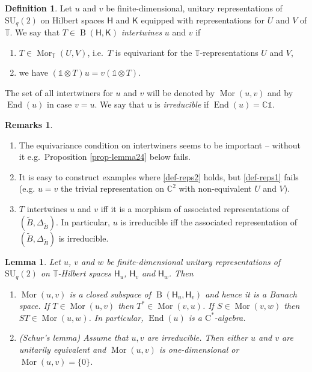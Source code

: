 \documentclass[12pt,reqno,a4paper]{amsart}
\newtheorem{lemma}[proposition]{Lemma}
\theoremstyle{definition}
\newtheorem{definition}[proposition]{Definition}
\newtheorem{remarks}[proposition]{Remarks}
\newtheorem{question}[proposition]{Question}
\newcommand{\cst}{\ensuremath{\mathrm{C}^*}}
\newcommand{\I}{\mathds{1}}
\newcommand{\ket}[1]{{\left|#1\right\rangle}}
\newcommand{\bra}[1]{{\left\langle#1\right|}}
\newcommand{\tens}{\otimes}
\newcommand{\CC}{\mathbb{C}}
\newcommand{\TT}{\mathbb{T}}
\newcommand{\sH}{\mathsf{H}}
\newcommand{\sK}{\mathsf{K}}
\DeclareMathOperator{\B}{B}
\DeclareMathOperator{\End}{End}
\DeclareMathOperator{\Mor}{Mor}
\newcommand{\SU}{\mathrm{SU}}
\numberwithin{equation}{section}
\begin{document}
\begin{definition}
Let $u$ and $v$ be finite-dimensional, unitary representations of $\SU_q(2)$ on Hilbert spaces $\sH$ and $\sK$ equipped with representations for $U$ and $V$ of $\TT$. We say that $T\in\B(\sH,\sK)$ \emph{intertwines} $u$ and $v$ if
\begin{enumerate}
\item\label{def-reps1} $T\in\Mor_\TT(U,V)$, i.e.~$T$ is equivariant for the $\TT$-representations $U$ and $V$,
\item\label{def-reps2} we have $(\I\tens T)u=v(\I\tens T)$.
\end{enumerate}
The set of all intertwiners for $u$ and $v$ will be denoted by $\Mor(u,v)$ and by $\End(u)$ in case $v=u$. We say that $u$ is \emph{irreducible} if $\End(u)=\CC\I$.
\end{definition}

\begin{remarks}\hspace*{\fill}
\begin{enumerate}
\item The equivariance condition on intertwiners seems to be important -- without it e.g.~Proposition \ref{prop-lemma24} below fails.
\item It is easy to construct examples where \eqref{def-reps2} holds, but \eqref{def-reps1} fails (e.g. $u=v$ the trivial representation on $\CC^2$ with non-equivalent $U$ and $V$).
\item $T$ intertwines $u$ and $v$ iff it is a morphism of associated representations of $(\widetilde{B},\Delta_{\widetilde{B}})$. In particular, $u$ is irreducible iff the associated representation of $(\widetilde{B},\Delta_{\widetilde{B}})$ is irreducible.
\end{enumerate}
\end{remarks}


\begin{lemma}
Let $u$, $v$ and $w$ be finite-dimensional unitary representations of $\SU_q(2)$ on $\TT$-Hilbert spaces $\sH_u$, $\sH_v$ and $\sH_w$. Then
\begin{enumerate}
\item $\Mor(u,v)$ is a closed subspace of $\B(\sH_u,\sH_v)$ and hence it is a Banach space. If $T\in\Mor(u,v)$ then $T^*\in\Mor(v,u)$. If $S\in\Mor(v,w)$ then $ST\in \Mor(u,w)$. In particular, $\End(u)$ is a \cst-algebra.
\item (Schur's lemma) Assume that $u,v$ are irreducible. Then either $u$ and $v$ are unitarily equivalent and $\Mor(u,v)$ is one-dimensional or $\Mor(u,v)=\{0\}$.
\end{enumerate}
\end{lemma}
\end{document}
